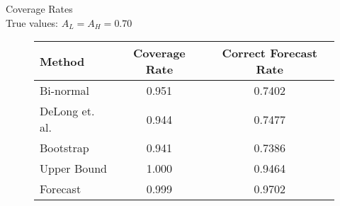 

Coverage Rates \\
True values: $A_L = A_H = 0.70$

\begin{figure}[h!]

\begin{center}


    \begin{tabular}{l c c }

    Method & Coverage Rate & Correct Forecast Rate \\

    \hline



          Bi-normal  &  0.951 & 0.7402 \\
     DeLong et. al.  &  0.944 & 0.7477 \\
          Bootstrap  &  0.941 & 0.7386 \\
        Upper Bound  &  1.000 & 0.9464 \\
           Forecast  &  0.999 & 0.9702 \\

    \hline

    \end{tabular}


\end{center}

%





\end{figure}



